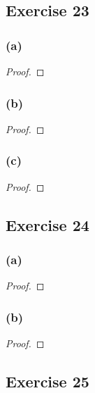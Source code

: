 \documentclass[14pt]{extarticle}
\begin{document}
\subsection{Exercise 23}

\subsubsection{(a)}

\begin{proof}

\end{proof}

\subsubsection{(b)}

\begin{proof}

\end{proof}

\subsubsection{(c)}

\begin{proof}

\end{proof}

\subsection{Exercise 24}

\subsubsection{(a)}

\begin{proof}

\end{proof}

\subsubsection{(b)}

\begin{proof}

\end{proof}

\subsection{Exercise 25}
\end{document}
